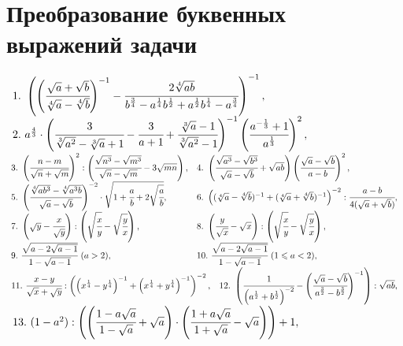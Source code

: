 \section{Преобразование буквенных выражений задачи}
$\begin{array}{ll}
1.\ \left(\left(\cfrac{\sqrt{a}+\sqrt{b}}{\sqrt[4]{a}-\sqrt[4]{b}}\right)^{-1}-
\cfrac{2\sqrt[4]{ab}}{b^{\frac{3}{4}}-a^{\frac{1}{4}}b^{\frac{1}{2}}+
a^{\frac{1}{2}}b^{\frac{1}{4}}-a^{\frac{3}{4}}}\right)^{-1},\\
2.\ a^{\frac{4}{3}}\cdot\left(\cfrac{3}{\sqrt[3]{a^2}-\sqrt[3]{a}+1}-
\cfrac{3}{a+1}+\cfrac{\sqrt[3]{a}-1}{\sqrt[3]{a^2}-1}\right)^{-1}
\left(\cfrac{a^{-\frac{1}{3}}+1}{a^\frac{1}{3}}\right)^2,\\
\end{array}$\\
$\begin{array}{ll}
3.\ \left(\cfrac{n-m}{\sqrt{n}+\sqrt{m}}\right)^2:\left(\cfrac{\sqrt{n^3}-\sqrt{m^3}}{\sqrt{n}-\sqrt{m}}-
3\sqrt{mn}\right),&
4.\ \left(\cfrac{\sqrt{a^3}-\sqrt{b^3}}{\sqrt{a}-\sqrt{b}}+
\sqrt{ab}\right)\left(\cfrac{\sqrt{a}-\sqrt{b}}{a-b}\right)^2,\\
5.\ \left(\cfrac{\sqrt[4]{ab^3}-\sqrt[4]{a^3b}}{\sqrt{a}-\sqrt{b}}\right)^{-2}\cdot
\sqrt{1+\cfrac{a}{b}+2\sqrt{\cfrac{a}{b}}},&
6.\ \left((\sqrt[4]{a}-\sqrt[4]{b})^{-1}+(\sqrt[4]{a}+\sqrt[4]{b})^{-1}\right)^{-2}:
\cfrac{a-b}{4(\sqrt{a}+\sqrt{b})},\\
7.\ \left(\sqrt{y}-\cfrac{x}{\sqrt{y}}\right):\left(\sqrt{\cfrac{x}{y}}-
\sqrt{\cfrac{y}{x}}\right),&
8.\ \left(\cfrac{y}{\sqrt{x}}-\sqrt{x}\right):\left(\sqrt{\cfrac{x}{y}}-
\sqrt{\cfrac{y}{x}}\right),\\
9.\ \cfrac{\sqrt{a-2\sqrt{a-1}}}{1-\sqrt{a-1}}\ (a>2),&
10.\ \cfrac{\sqrt{a-2\sqrt{a-1}}}{1-\sqrt{a-1}}\ (1\leqslant a<2),\end{array}$ \\
$\begin{array}{ll}
11.\ \cfrac{x-y}{\sqrt{x}+\sqrt{y}}:\left(\left(x^\frac{1}{4}-y^\frac{1}{4}\right)^{-1}+
\left(x^\frac{1}{4}+y^\frac{1}{4}\right)^{-1}\right)^{-2},&
12.\ \left(\cfrac{1}{\left(a^\frac{1}{2}+b^\frac{1}{2}\right)^{-2}}-\left(\cfrac{\sqrt{a}-\sqrt{b}}{a^\frac{3}{2}-b^\frac{3}{2}}\right)^{-1}\right):\sqrt{ab},\end{array}$  \\
$\begin{array}{ll}
13.\ (1-a^2):\left(\left(\cfrac{1-a\sqrt{a}}{1-\sqrt{a}}+\sqrt{a}\right)\cdot
\left(\cfrac{1+a\sqrt{a}}{1+\sqrt{a}}-\sqrt{a}\right)\right)+1,
\end{array}$ \\
